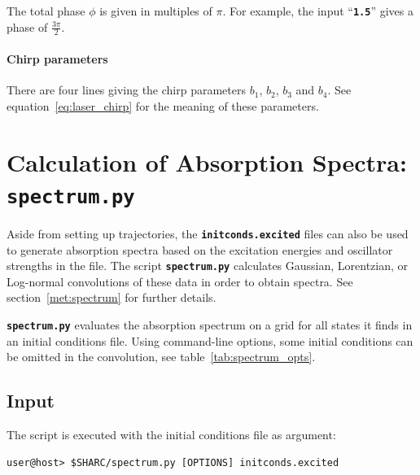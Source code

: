 \documentclass[a4paper,10pt,DIV=15,openany]{scrbook}
\newcommand{\ttt}[1]{\textbf{\texttt{#1}}}
\begin{document}
The total phase $\phi$ is given in multiples of $\pi$. For example, the input ``\ttt{1.5}'' gives a phase of $\frac{3\pi}{2}$.

\paragraph{Chirp parameters}

There are four lines giving the chirp parameters $b_1$, $b_2$, $b_3$ and $b_4$. See equation~\eqref{eq:laser_chirp} for the meaning of these parameters.








\section{Calculation of Absorption Spectra: \ttt{spectrum.py}}\label{sec:spectrum.py}

Aside from setting up trajectories, the \ttt{initconds.excited} files can also be used to generate absorption spectra based on the excitation energies and oscillator strengths in the file. The script \ttt{spectrum.py} calculates Gaussian, Lorentzian, or Log-normal convolutions of these data in order to obtain spectra. See section~\ref{met:spectrum} for further details.

\ttt{spectrum.py} evaluates the absorption spectrum on a grid for all states it finds in an initial conditions file. Using command-line options, some initial conditions can be omitted in the convolution, see table~\ref{tab:spectrum_opts}.

\subsection{Input}

The script is executed with the initial conditions file as argument:
\begin{verbatim}
user@host> $SHARC/spectrum.py [OPTIONS] initconds.excited
\end{verbatim}
\end{document}
